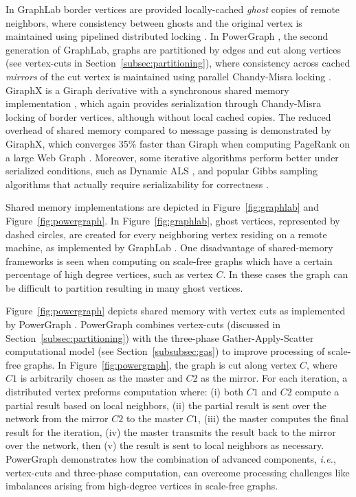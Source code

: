 \documentclass[reprint,twocolumn,showpacs,preprintnumbers,amsmath, aps,pre,amssymb]{revtex4-1}
\begin{document}
In GraphLab \cite{Low2012} border vertices are provided locally-cached \textit{ghost} copies of remote neighbors, where consistency between ghosts and the original vertex is maintained using pipelined distributed locking \cite{Dijkstra1971}.  In PowerGraph \cite{Gonzalez2012}, the second generation of GraphLab, graphs are partitioned by edges and cut along vertices (see vertex-cuts in Section~\ref{subsec:partitioning}), where consistency across cached \textit{mirrors} of the cut vertex is maintained using parallel Chandy-Misra locking \cite{Chandy1984}.  GiraphX is a Giraph derivative with a synchronous shared memory implementation \cite{Tasci2013}, which again provides serialization through Chandy-Misra locking of border vertices, although without local cached copies.  The reduced overhead of shared memory compared to message passing is demonstrated by GiraphX, which converges 35\% faster than Giraph when computing PageRank on a large Web Graph \cite{Tasci2013}.  Moreover, some iterative algorithms perform better under serialized conditions, such as Dynamic ALS \cite{Zhou2008,Low2012}, and popular Gibbs sampling algorithms that actually require serializability for correctness \cite{Gonzalez2011}.  

Shared memory implementations are depicted in Figure~\ref{fig:graphlab} and Figure~\ref{fig:powergraph}.  In Figure~\ref{fig:graphlab}, ghost vertices, represented by dashed circles, are created for every neighboring vertex residing on a remote machine, as implemented by GraphLab \cite{Low2012}.  One disadvantage of shared-memory frameworks is seen when computing on scale-free graphs which have a certain percentage of high degree vertices, such as vertex $C$. In these cases the graph can be difficult to partition \cite{Leskovec2009} resulting in many ghost vertices.

Figure~\ref{fig:powergraph} depicts shared memory with vertex cuts as implemented by PowerGraph \cite{Gonzalez2012}.  PowerGraph combines vertex-cuts (discussed in Section~\ref{subsec:partitioning}) with the three-phase Gather-Apply-Scatter computational model (see Section~\ref{subsubsec:gas}) to improve processing of scale-free graphs.  In Figure~\ref{fig:powergraph}, the graph is cut along vertex $C$, where $C1$ is arbitrarily chosen as the master and $C2$ as the mirror.  For each iteration, a distributed vertex preforms computation where: (i) both $C1$ and $C2$ compute a partial result based on local neighbors, (ii) the partial result is sent over the network from the mirror $C2$ to the master $C1$, (iii) the master computes the final result for the iteration, (iv) the master transmits the result back to the mirror over the network, then (v) the result is sent to local neighbors as necessary.  PowerGraph demonstrates how the combination of advanced components, {\em i.e.}, vertex-cuts and three-phase computation, can overcome processing challenges like imbalances arising from high-degree vertices in scale-free graphs.  
\end{document}
